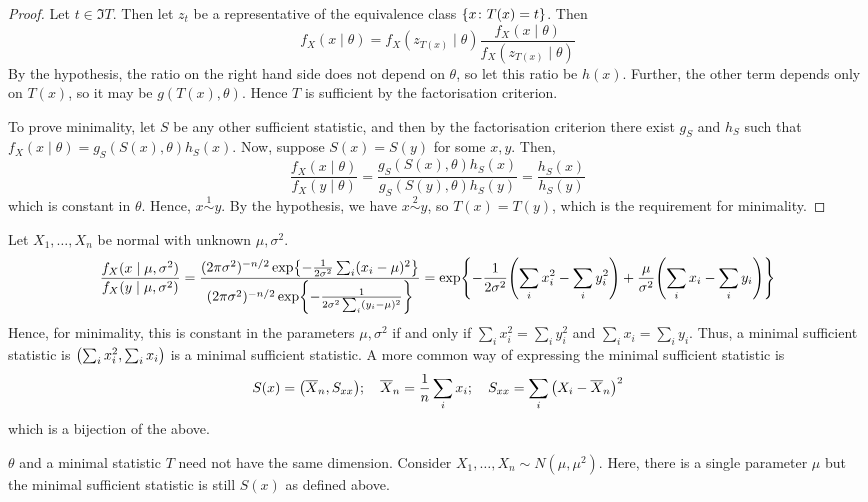\begin{proof}
	Let \( t \in \Im T \).
	Then let \( z_t \) be a representative of the equivalence class \( \qty{x \colon T(x) = t} \).
	Then
	\[ f_X(x \mid \theta) = f_X(z_{T(x)} \mid \theta) \frac{f_X(x \mid \theta)}{f_X(z_{T(x)} \mid \theta)} \]
	By the hypothesis, the ratio on the right hand side does not depend on \( \theta \), so let this ratio be \( h(x) \).
	Further, the other term depends only on \( T(x) \), so it may be \( g(T(x), \theta) \).
	Hence \( T \) is sufficient by the factorisation criterion.

	To prove minimality, let \( S \) be any other sufficient statistic, and then by the factorisation criterion there exist \( g_S \) and \( h_S \) such that \( f_X(x \mid \theta) = g_S(S(x), \theta) h_S(x) \).
	Now, suppose \( S(x) = S(y) \) for some \( x, y \).
	Then,
	\[ \frac{f_X(x \mid \theta)}{f_X(y \mid \theta)} = \frac{g_S(S(x), \theta) h_S(x)}{g_S(S(y), \theta) h_S(y)} = \frac{h_S(x)}{h_S(y)} \]
	which is constant in \( \theta \).
	Hence, \( x \overset{1}{\sim} y \).
	By the hypothesis, we have \( x \overset{2}{\sim} y \), so \( T(x) = T(y) \), which is the requirement for minimality.
\end{proof}
\begin{example}
	Let \( X_1, \dots, X_n \) be normal with unknown \( \mu, \sigma^2 \).
	\[ \frac{f_X(x \mid \mu, \sigma^2)}{f_X(y \mid \mu, \sigma^2)} = \frac{(2 \pi \sigma^2)^{-n/2} \exp{-\frac{1}{2\sigma^2} \sum_i (x_i - \mu)^2}}{(2 \pi \sigma^2)^{-n/2} \exp{-\frac{1}{2\sigma^2 \sum_i (y_i - \mu)^2}}} = \exp{-\frac{1}{2\sigma^2} \qty(\sum_i x_i^2 - \sum_i y_i^2) + \frac{\mu}{\sigma^2} \qty(\sum_i x_i - \sum_i y_i)} \]
	Hence, for minimality, this is constant in the parameters \( \mu, \sigma^2 \) if and only if \( \sum_i x_i^2 = \sum_i y_i^2 \) and \( \sum_i x_i = \sum_i y_i \).
	Thus, a minimal sufficient statistic is \( \qty(\sum_i x_i^2, \sum_i x_i) \) is a minimal sufficient statistic.
	A more common way of expressing the minimal sufficient statistic is
	\[ S(x) = \qty(\overline X_n, S_{xx});\quad \overline X_n = \frac{1}{n} \sum_i x_i;\quad S_{xx} = \sum_i \qty(X_i - \overline X_n)^2 \]
	which is a bijection of the above.
\end{example}
\begin{example}
	\( \theta \) and a minimal statistic \( T \) need not have the same dimension.
	Consider \( X_1, \dots, X_n \sim N(\mu, \mu^2) \).
	Here, there is a single parameter \( \mu \) but the minimal sufficient statistic is still \( S(x) \) as defined above.
\end{example}

